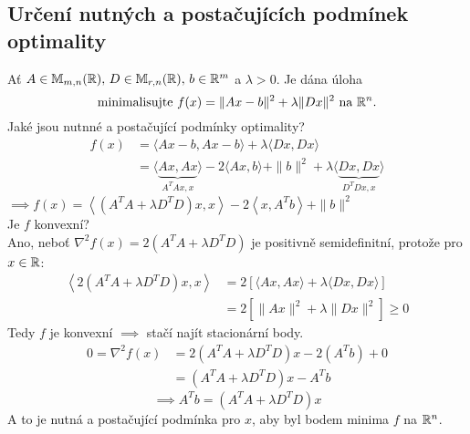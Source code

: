 \subsection{Určení nutných a postačujících podmínek optimality}
Ať $A \in \mathbb{M}_{m,n} (\mathbb{R}), \, D \in \mathbb{M}_{r,n}(\mathbb{R}), \, b\in \mathbb{R}^m$ a $\lambda > 0$. Je dána úloha
\[
    \text{minimalisujte } f(x) = \| Ax - b\|^2 + \lambda \| Dx\|^2  \text{ na } \mathbb{R}^n.
\]
Jaké jsou nutnné a postačující podmínky optimality?
\begin{align*}
    f(x) &= \langle Ax - b, Ax - b\rangle + \lambda \langle Dx, Dx\rangle \\
    &= \langle \underbrace{Ax, Ax}_{A^TAx, x}\rangle - 2\langle Ax, b\rangle + \| b\|^2 + \lambda \langle 
        \underbrace{Dx, Dx}_{D^TDx, x}\rangle
\end{align*}
$\implies f(x) = \left\langle \left(A^TA + \lambda D^TD\right)x, x\right\rangle - 2 \left\langle x, A^T b\right\rangle 
+ \| b\|^2$\\
Je $f$ konvexní?\\
Ano, neboť $\nabla^2 f(x) = 2(A^TA + \lambda D^TD)$ je positivně semidefinitní, protože pro $x \in \mathbb{R}$:
\begin{align*}
    \left\langle 2\left(A^TA + \lambda D^TD\right)x, x\right\rangle &= 2 \left[ \langle Ax, Ax\rangle + \lambda 
    \langle Dx, Dx\rangle\right] \\
    &= 2 \left[ \|Ax\|^2 + \lambda \|Dx\|^2\right] \geq 0
\end{align*}
Tedy $f$ je konvexní $\implies$ stačí najít stacionární body.
\begin{align*}
    0 = \nabla^2 f(x) &= 2 (A^TA + \lambda D^TD)x - 2(A^Tb) + 0 \\
    &= (A^TA + \lambda D^TD)x - A^Tb
\end{align*}
\[
    \implies A^Tb = (A^TA + \lambda D^TD)x
\]
A to je nutná a postačující podmínka pro $x$, aby byl bodem minima $f$ na $\mathbb{R}^n$.
    
